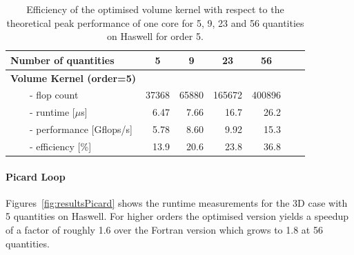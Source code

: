 \documentclass{acm_proc_article-sp}
\begin{document}
\begin{table}
  \centering
\begin{tabular}{l|rrrrrr}
  \textbf{Number of quantities}                & \multicolumn{1}{c}{5}& \multicolumn{1}{c}{9}&\multicolumn{1}{c}{23}&\multicolumn{1}{c}{56}\\ \hline
\textbf{Volume Kernel (order=5)}                   & &&&&& \\
 ~~~~- flop count                          & 37368    & 65880 & 165672 & 400896\\
 ~~~~- runtime [$\mu$s]                    & 6.47     & 7.66  & 16.7   & 26.2 \\  
 ~~~~- performance [Gflops/s]              & 5.78     & 8.60  & 9.92   & 15.3 \\   
 ~~~~- efficiency [\%]                     & 13.9     & 20.6  & 23.8   & 36.8 \\
\end{tabular}
\caption{Efficiency of the optimised volume kernel with respect to the theoretical peak performance of one core for 5, 9, 23 and 56 quantities on Haswell for order 5.}\label{tab:flopcount2}
\end{table}


\paragraph{Picard Loop}
Figures~\ref{fig:resultsPicard} shows the runtime measurements for the 3D case with 5 quantities on Haswell.
For higher orders the optimised version yields a speedup of a factor of roughly 1.6 over the Fortran version which grows to 1.8 at 56 quantities. 
\end{document}
